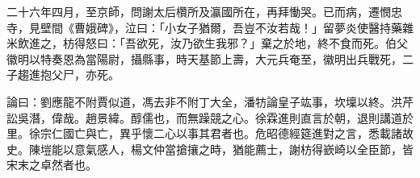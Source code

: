 \begin{pinyinscope}
 二十六年四月，至京師，問謝太后欑所及瀛國所在，再拜慟哭。已而病，遷憫忠寺，見壁間《曹娥碑》，泣曰：「小女子猶爾，吾豈不汝若哉！」留夢炎使醫持藥雜米飲進之，枋得怒曰：「吾欲死，汝乃欲生我邪？」棄之於地，終不食而死。伯父徽明以特奏恩為當陽尉，攝縣事，時天基節上壽，大元兵奄至，徽明出兵戰死，二子趨進抱父尸，亦死。



 論曰：劉應龍不附賈似道，馮去非不附丁大全，潘牥論皇子竑事，坎壈以終。洪芹訟吳潛，偉哉。趙景緯。醇儒也，而無躁競之心。徐霖進則直言於朝，退則講道於里。徐宗仁國亡與亡，異乎懷二心以事其君者也。危昭德經筵進對之言，悉載諸故史。陳塏能以意氣感人，楊文仲當搶攘之時，猶能薦士，謝枋得嶔崎以全臣節，皆宋末之卓然者也。



\end{pinyinscope}